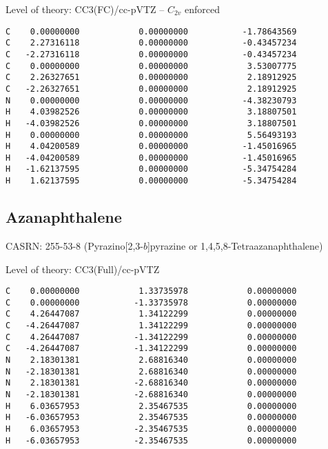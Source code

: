 \documentclass[journal=jctcce,manuscript=article,layout=traditional]{achemso}
\newcommand{\TZ}{cc-pVTZ}
\begin{document}
\begin{singlespace}
\noindent Level of theory: CC3(FC)/{\TZ} -- $C_{2v}$ enforced
\begin{verbatim}
C    0.00000000            0.00000000           -1.78643569
C    2.27316118            0.00000000           -0.43457234
C   -2.27316118            0.00000000           -0.43457234
C    0.00000000            0.00000000            3.53007775
C    2.26327651            0.00000000            2.18912925
C   -2.26327651            0.00000000            2.18912925
N    0.00000000            0.00000000           -4.38230793
H    4.03982526            0.00000000            3.18807501
H   -4.03982526            0.00000000            3.18807501
H    0.00000000            0.00000000            5.56493193
H    4.04200589            0.00000000           -1.45016965
H   -4.04200589            0.00000000           -1.45016965
H   -1.62137595            0.00000000           -5.34754284
H    1.62137595            0.00000000           -5.34754284
\end{verbatim}
\end{singlespace}

\subsection{Azanaphthalene}

CASRN: 255-53-8 (Pyrazino[2,3-$b$]pyrazine or 1,4,5,8-Tetraazanaphthalene)

\begin{singlespace}
\noindent Level of theory: CC3(Full)/{\TZ}
\begin{verbatim}
C    0.00000000            1.33735978            0.00000000
C    0.00000000           -1.33735978            0.00000000
C    4.26447087            1.34122299            0.00000000
C   -4.26447087            1.34122299            0.00000000
C    4.26447087           -1.34122299            0.00000000
C   -4.26447087           -1.34122299            0.00000000
N    2.18301381            2.68816340            0.00000000
N   -2.18301381            2.68816340            0.00000000
N    2.18301381           -2.68816340            0.00000000
N   -2.18301381           -2.68816340            0.00000000
H    6.03657953            2.35467535            0.00000000
H   -6.03657953            2.35467535            0.00000000
H    6.03657953           -2.35467535            0.00000000
H   -6.03657953           -2.35467535            0.00000000
\end{verbatim}
\end{singlespace}
\end{document}
